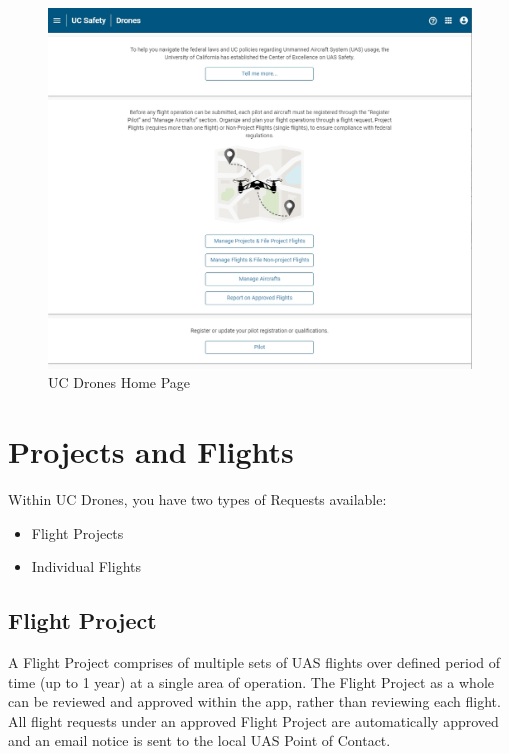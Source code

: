 \documentclass[
]{book}
\providecommand{\tightlist}{%
  \setlength{\itemsep}{0pt}\setlength{\parskip}{0pt}}
\begin{document}
\begin{figure}

{\centering \includegraphics[width=0.85\linewidth]{images/UCDrones_Home} 

}

\caption{UC Drones Home Page}\label{fig:UCDrones-home}
\end{figure}

\hypertarget{projects-and-flights}{%
\section{Projects and Flights}\label{projects-and-flights}}

Within UC Drones, you have two types of Requests available:

\begin{itemize}
\tightlist
\item
  Flight Projects
\item
  Individual Flights
\end{itemize}

\hypertarget{flight-project}{%
\subsection{Flight Project}\label{flight-project}}

A Flight Project comprises of multiple sets of UAS flights over defined period of time (up to 1 year) at a single area of operation. The Flight Project as a whole can be reviewed and approved within the app, rather than reviewing each flight. All flight requests under an approved Flight Project are automatically approved and an email notice is sent to the local UAS Point of Contact.
\end{document}
